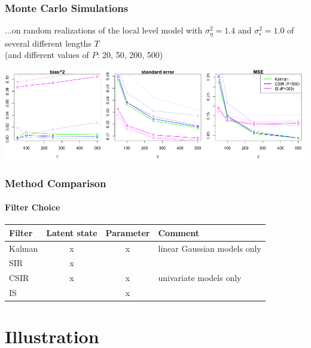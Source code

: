 \documentclass[11pt]{beamer}
\begin{document}
\begin{frame}
\end{frame}

\begin{frame}
\frametitle{Monte Carlo Simulations}
...on random realizations of the local level model with $\sigma_{\eta}^2=1.4$ and $\sigma_{\epsilon}^2=1.0$ of several different lengths $T$ \\(and different values of $P$: 20, 50, 200, 500)
\bigskip
\begin{center}
\includegraphics[scale=0.33]{ullm-mc-mle}
\end{center}
\end{frame}

\begin{frame}
\frametitle{Method Comparison}
\framesubtitle{Filter Choice}
\begin{table}
\centering
\begin{tabular}{lccl}
\hline
Filter  & Latent state & Parameter & Comment\\
\hline
Kalman    & x & x & linear Gaussian models only\\
SIR      & x & &\\
CSIR      & x & x & univariate models only\\
IS      & & x & \\
\hline
\end{tabular}
\end{table}
\end{frame}

\section{Illustration}
\end{document}
